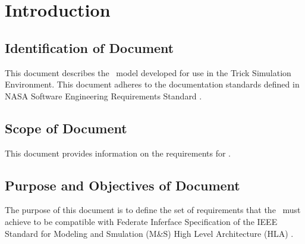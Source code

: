 \documentclass[twoside,11pt,titlepage]{report}
\begin{document}

\date{June 2020}
\modelname{\TrickHLA}
\author{Edwin Z. Crues \\ and \\ Daniel E. Dexter}
\makeTrickhlaenvTitlepage



\tableofcontents
\vfill

\pagebreak


\chapter{Introduction}\label{sec:intro}



\section{Identification of Document}
This document describes the \TrickHLA\
model developed for use in the Trick Simulation Environment.
This document adheres to the documentation standards defined in
NASA Software Engineering Requirements Standard \cite{NASA:SWE}.

\section{Scope of Document}
This document provides information on the requirements for \TrickHLA.

\section{Purpose and Objectives of Document}
The purpose of this document is to define the set of requirements that
the \TrickHLA\ must achieve to be compatible with Federate Inferface
Specification of the IEEE Standard for Modeling and Smulation (M\&S)
High Level Architecture (HLA) \cite{IEEE1516:API}.
\end{document}
